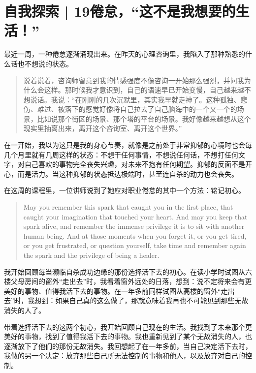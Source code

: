 \chapter{自我探索 | 19\pozhehao{}倦怠，“这不是我想要的生活！”}




最近一周，一种倦怠逐渐涌现出来。在昨天的心理咨询里，我陷入了那种熟悉的什么话也不想说的状态。

\blockquote{
	说着说着，咨询师留意到我的情感强度不像咨询一开始那么强烈，并问我为什么会这样。那时候我才意识到，自己的语速早已开始变慢，自己越来越不想说话。我说：“在刚刚的几次沉默里，其实我早就走神了。这种孤独、悲伤、难过、被落下的感觉好像将自己拉去了自己脑海中的一个又一个的场景，比如说那个街区的场景、那个塔的平台的场景。我好像越来越想从这个现实里抽离出来，离开这个咨询室、离开这个世界。”

}

在一开始，我以为这只是我的身心节奏，就像是之前处于非常抑郁的心境时也会每几个月里就有几周这样的状态：不想干任何事情，不想说任何话，不想打任何文字，对自己喜欢的事物完全丧失兴趣，对未来不抱有任何期望。抑郁的反面不是开心，而是活力。当这种抑郁的状态抵达极端时，甚至连自杀的动力也会丧失。

在这周的课程里，一位讲师说到了她应对职业倦怠的其中一个方法：铭记初心。

\blockquote{May you remember this spark that caught you in the first place, that caught your imagination that touched your heart. And may you keep that spark alive, and remember the immense privilege it is to sit with another human being. And at those moments when you forget it, or you get tired, or you get frustrated, or question yourself, take time and remember again the spark and the privilege of being a healer.}

我开始回顾每当濒临自杀成功边缘的那份选择活下去的初心。在读小学时试图从六楼父母房间的窗外“走出去”时，我看着窗外远处的日落，想到：说不定将来会有更美好的事物、值得我活下去的事物。在一年多前同样试图从高楼的窗外“走出去”时，我想到：如果自己真的这么做了，那就意味着我再也不可能见到那些无故消失的人了。

带着选择活下去的这两个初心，我开始回顾自己现在的生活。我找到了未来那个更美好的事物，找到了值得我活下去的事物。我也重新见到了某个无故消失的人，也逐渐放下了他们的那份无故消失。我回想起了在一年多前，当自己决定活下去时，我做的另一个决定：放弃那些自己所无法控制的事物和他人，以及放弃对自己的控制。

